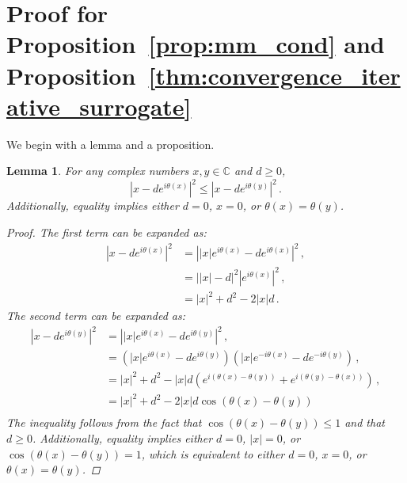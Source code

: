 \documentclass{article}
\numberwithin{equation}{section}
\newtheorem{lemma}[theorem]{Lemma}     %
\begin{document}
\section{Proof for Proposition~\ref{prop:mm_cond} and Proposition~\ref{thm:convergence_iterative_surrogate}}
We begin with a lemma and a proposition.
\begin{lemma}\label{lem:convergence_iterative_surrogate}
    For any complex numbers $x,y\in\mathbb{C}$ and $d\geq0$, 
    \begin{equation*}
        \left|x-de^{i\theta(x)}\right|^2\leq\left|x-de^{  i\theta(y)}\right|^2\,.
    \end{equation*}
    Additionally, equality implies either $d = 0$, $x = 0$, or $\theta(x)=\theta(y)$.
    \begin{proof}
        The first term can be expanded as:
        \begin{equation*}
            \begin{aligned}
                \left|x-de^{i\theta(x)}\right|^2&=\left||x|e^{i\theta(x)}-de^{i\theta(x)}\right|^2\,,\\
                &= \left||x|-d\right|^2\left|e^{i\theta(x)}\right|^2\,,\\
                &=|x|^2+d^2-2|x|d\,.
            \end{aligned}
        \end{equation*}
        The second term can be expanded as:
        \begin{equation*}
            \begin{aligned}
                \left|x-de^{i\theta(y)}\right|^2&=\left||x|e^{i\theta(x)}-de^{i\theta(y)}\right|^2\,,\\
                &=\left(|x|e^{i\theta(x)}-de^{i\theta(y)}\right)\left(|x|e^{-i\theta(x)}-de^{-i\theta(y)}\right)\,,\\
                &=|x|^2+d^2-|x|d\left(e^{i(\theta(x)-\theta(y))}+e^{i(\theta(y)-\theta(x))}\right)\,,\\
                &=|x|^2+d^2-2|x|d\cos(\theta(x)-\theta(y))\\
            \end{aligned}
        \end{equation*}
        The inequality follows from the fact that $\cos(\theta(x)-\theta(y))\leq1$ and that $d\geq0$. Additionally, equality implies either $d=0$, $|x|=0$, or $\cos(\theta(x)-\theta(y))=1$, which is equivalent to either $d=0$, $x=0$, or $\theta(x)=\theta(y)$.
    \end{proof}
\end{lemma}
\end{document}
